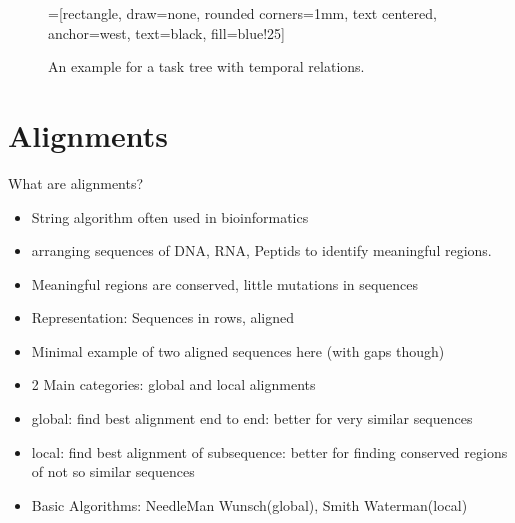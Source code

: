 	\begin{figure}
		=[rectangle, draw=none, rounded corners=1mm,
		        text centered, anchor=west, text=black, fill=blue!25]
		
		\label{fig:exampletasktree}
		\caption{An example for a task tree with temporal relations\cite{harms2013}.}
	\end{figure}
\section{Alignments}
What are alignments? 
\begin{itemize}
	\item String algorithm often used in bioinformatics 
	\item arranging sequences of DNA, RNA, Peptids to identify meaningful regions.
	\item Meaningful regions are conserved, little mutations in sequences
	\item Representation: Sequences in rows, aligned 
	\item Minimal example of two aligned sequences here (with gaps though)
	\item 2 Main categories: global and local alignments 
	\item global: find best alignment end to end: better for very similar sequences
	\item local: find best alignment of subsequence: better for finding conserved regions of not so similar sequences
	\item Basic Algorithms: NeedleMan Wunsch(global), Smith Waterman(local) 
\end{itemize} 


